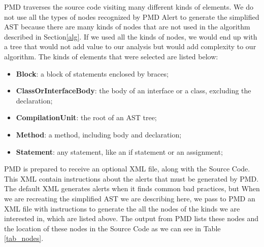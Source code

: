 \documentclass[
]{article}
\begin{document}
PMD traverses the source code visiting many different kinds of elements.
We do not use all the types of nodes recognized by PMD Alert to generate
the simplified AST because there are many kinds of nodes that are not
used in the algorithm described in Section\ref{alg}. If we used all the
kinds of nodes, we would end up with a tree that would not add value to
our analysis but would add complexity to our algorithm. The kinds of
elements that were selected are listed below:

\begin{itemize}


\item \textbf{Block}: a block of statements enclosed by braces;

\item \textbf{ClassOrInterfaceBody}: the body of an interface or a class, excluding the declaration;

\item \textbf{CompilationUnit}: the root of an AST tree;

\item \textbf{Method}: a method, including body and declaration;

\item \textbf{Statement}: any statement, like an if statement or an assignment;

\end{itemize}

PMD is prepared to receive an optional XML file, along with the Source
Code. This XML contain instructions about the alerts that must be
generated by PMD. The default XML generates alerts when it finds common
bad practices, but When we are recreating the simplified AST we are
describing here, we pass to PMD an XML file with instructions to
generate the all the nodes of the kinds we are interested in, which are
listed above. The output from PMD lists these nodes and the location of
these nodes in the Source Code as we can see in Table \ref{tab_nodes}.

\small
\end{document}

